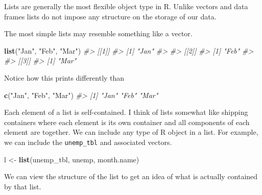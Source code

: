 \documentclass[
]{book}
\newenvironment{Shaded}{\begin{snugshade}}{\end{snugshade}}
\newcommand{\CommentTok}[1]{\textcolor[rgb]{0.56,0.35,0.01}{\textit{#1}}}
\newcommand{\KeywordTok}[1]{\textcolor[rgb]{0.13,0.29,0.53}{\textbf{#1}}}
\newcommand{\NormalTok}[1]{#1}
\newcommand{\StringTok}[1]{\textcolor[rgb]{0.31,0.60,0.02}{#1}}
\begin{document}
Lists are generally the most flexible object type in R. Unlike vectors and data frames lists do not impose any structure on the storage of our data.

The most simple lists may resemble something like a vector.

\begin{Shaded}
\begin{Highlighting}[]
\KeywordTok{list}\NormalTok{(}\StringTok{"Jan"}\NormalTok{, }\StringTok{"Feb"}\NormalTok{, }\StringTok{"Mar"}\NormalTok{)}
\CommentTok{\#\textgreater{} [[1]]}
\CommentTok{\#\textgreater{} [1] "Jan"}
\CommentTok{\#\textgreater{} }
\CommentTok{\#\textgreater{} [[2]]}
\CommentTok{\#\textgreater{} [1] "Feb"}
\CommentTok{\#\textgreater{} }
\CommentTok{\#\textgreater{} [[3]]}
\CommentTok{\#\textgreater{} [1] "Mar"}
\end{Highlighting}
\end{Shaded}

Notice how this prints differently than

\begin{Shaded}
\begin{Highlighting}[]
\KeywordTok{c}\NormalTok{(}\StringTok{"Jan"}\NormalTok{, }\StringTok{"Feb"}\NormalTok{, }\StringTok{"Mar"}\NormalTok{)}
\CommentTok{\#\textgreater{} [1] "Jan" "Feb" "Mar"}
\end{Highlighting}
\end{Shaded}

Each element of a list is self-contained. I think of lists somewhat like shipping containers where each element is its own container and all components of each element are together. We can include any type of R object in a list. For example, we can include the \texttt{unemp\_tbl} and associated vectors.

\begin{Shaded}
\begin{Highlighting}[]
\NormalTok{l \textless{}{-}}\StringTok{ }\KeywordTok{list}\NormalTok{(unemp\_tbl, unemp, month.name)}
\end{Highlighting}
\end{Shaded}

We can view the structure of the list to get an idea of what is actually contained by that list.

\begin{Shaded}
\end{Shaded}
\end{document}
